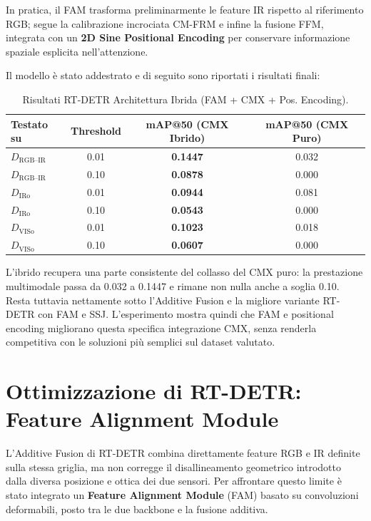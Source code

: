 \documentclass[a4paper,11pt]{article}
\begin{document}
In pratica, il FAM trasforma preliminarmente le feature IR rispetto al riferimento RGB; segue la calibrazione incrociata CM-FRM e infine la fusione FFM, integrata con un \textbf{2D Sine Positional Encoding} per conservare informazione spaziale esplicita nell'attenzione.

Il modello è stato addestrato e di seguito sono riportati i risultati finali:

\begin{table}[h]
\centering
\caption{Risultati RT-DETR Architettura Ibrida (FAM + CMX + Pos. Encoding).}
\label{tab:rtdetr_cmx_hybrid}
\begin{tabular}{lccc}
\toprule
Testato su & Threshold & mAP@50 (CMX Ibrido) & mAP@50 (CMX Puro) \\
\midrule
$D_{\text{RGB--IR}}$ & 0.01 & \textbf{0.1447} & 0.032 \\
$D_{\text{RGB--IR}}$ & 0.10 & \textbf{0.0878} & 0.000 \\
\midrule
$D_{\text{IRo}}$ & 0.01 & \textbf{0.0944} & 0.081 \\
$D_{\text{IRo}}$ & 0.10 & \textbf{0.0543} & 0.000 \\
\midrule
$D_{\text{VISo}}$ & 0.01 & \textbf{0.1023} & 0.018 \\
$D_{\text{VISo}}$ & 0.10 & \textbf{0.0607} & 0.000 \\
\bottomrule
\end{tabular}
\end{table}

L'ibrido recupera una parte consistente del collasso del CMX puro: la prestazione multimodale passa da 0.032 a 0.1447 e rimane non nulla anche a soglia 0.10. Resta tuttavia nettamente sotto l'Additive Fusion e la migliore variante RT-DETR con FAM e SSJ. L'esperimento mostra quindi che FAM e positional encoding migliorano questa specifica integrazione CMX, senza renderla competitiva con le soluzioni più semplici sul dataset valutato.

\newpage

\section{Ottimizzazione di RT-DETR: Feature Alignment Module}

L'Additive Fusion di RT-DETR combina direttamente feature RGB e IR definite sulla stessa griglia, ma non corregge il disallineamento geometrico introdotto dalla diversa posizione e ottica dei due sensori. Per affrontare questo limite è stato integrato un \textbf{Feature Alignment Module} (FAM) basato su convoluzioni deformabili, posto tra le due backbone e la fusione additiva.
\end{document}
